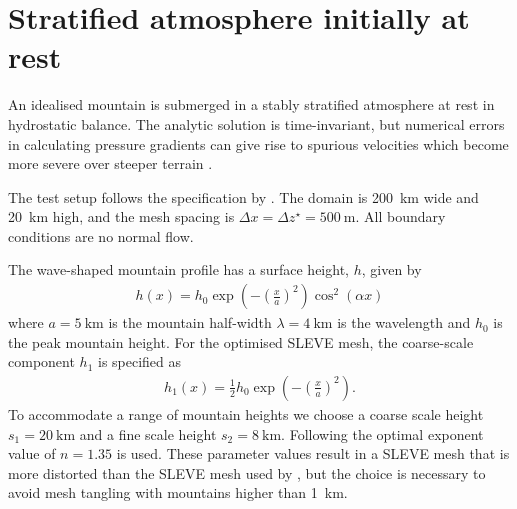 \section{Stratified atmosphere initially at rest}
\label{sec:slanted:resting}


An idealised mountain is submerged in a stably stratified atmosphere at rest in hydrostatic balance.  The analytic solution is time-invariant, but numerical errors in calculating pressure gradients can give rise to spurious velocities which become more severe over steeper terrain \citep{klemp2011}.

The test setup follows the specification by \cite{klemp2011}.  The domain is \SI{200}{\kilo\meter} wide and \SI{20}{\kilo\meter} high, and the mesh spacing is \(\Delta x = \Delta z^\star = \SI{500}{\meter}\).  All boundary conditions are no normal flow.

The wave-shaped mountain profile has a surface height, $h$, given by
\begin{align}
	h(x) = h_0 \exp \left( - \left( \frac{x}{a} \right)^2 \right) \cos^2 \left( \alpha x \right) \label{eqn:resting:mountain}
\end{align}
where $a = \SI{5}{\kilo\meter}$ is the mountain half-width $\lambda = \SI{4}{\kilo\meter}$ is the wavelength and $h_0$ is the peak mountain height.  For the optimised SLEVE mesh, the coarse-scale component $h_1$ is specified as
\begin{align}
	h_1(x) = \frac{1}{2} h_0 \exp \left( - \left( \frac{x}{a} \right)^2 \right) \text{.}
\end{align}
To accommodate a range of mountain heights we choose a coarse scale height $s_1 = \SI{20}{\kilo\meter}$ and a fine scale height $s_2 = \SI{8}{\kilo\meter}$.  Following \citet{leuenberger2010} the optimal exponent value of $n = \num{1.35}$ is used.  These parameter values result in a SLEVE mesh that is more distorted than the SLEVE mesh used by \citet{klemp2011}, but the choice is necessary to avoid mesh tangling with mountains higher than \SI{1}{\kilo\meter}.

